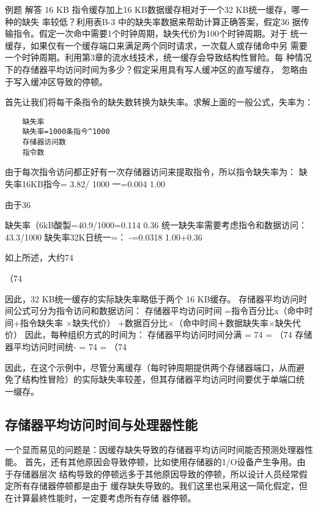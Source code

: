 例题
解答
16 KB 指令缓存加上16 KB数据缓存相对于一个32 KB统一缓存，哪一种的缺失
率较低？利用表B-3 中的缺失率数据来帮助计算正确答案，假定36%
据传输指令。假定一次命中需要1个时钟周期，缺失代价为100个时钟周期。对于
统一缓存，如果仅有一个缓存端口来满足两个同时请求，一次载人或存储命中另
需要一个时钟周期。利用第3章的流水线技术，统一缓存会导致结构性冒险。每
种情况下的存储器平均访问时间为多少？假定采用具有写人缓冲区的直写缓存，
忽略由于写入缓冲区导致的停顿。

首先让我们将每干条指令的缺失数转换为缺失率。求解上面的一般公式，失率为：

\begin{verbatim}
    缺失率
    缺失率=1000条指今^1000
    存储器访问数
    指令数
\end{verbatim}

由于每次指令访问都正好有一次存储器访问来提取指令，所以指令缺失率为：
缺失率16KB指今=
3.82/ 1000
一=0.004
1.00

由于36%

缺失率（6kB酸製=40.9/1000=0.114
0.36
统一缺失率需要考虑指令和数据访问：
43.3/1000
缺失率32K日统一=：
-=0.0318
1.00+0.36

如上所述，大约74%

（74%

因此，32 KB统一缓存的实际缺失率略低于两个 16 KB缓存。
存储器平均访问时间公式可分为指令访问和数据访问：
存储器平均访问时间
=指令百分比x（命中时间+指令缺失率 ×缺失代价）
+数据百分比×（命中时间＋数据缺失率×缺失代价）
因此，每种组织方式的时间为：
存储器平均访问时间分满
= 74%
= （74%
存储器平均访问时间统-
= 74%
= （74%

因此，在这个示例中，尽管分离缓存（每时钟周期提供两个存储器端口，从而避
免了结构性冒险）的实际缺失率较差，但其存储器平均访问时间要优于单端口统
一缀存。

\subsection{存储器平均访问时间与处理器性能}
一个显而易见的问题是：因缓存缺失导致的存储器平均访问时间能否预测处理器性能。
首先，还有其他原因会导致停顿，比如使用存储器的1/O设备产生争用。由于存储器层次
结构导致的停顿远多于其他原因导致的停顿，所以设计人员经常假定所有存储器停顿都是由于
缓存缺失导致的。我们这里也采用这一简化假定，但在计算最終性能时，一定要考虑所有存储
器停顿。

